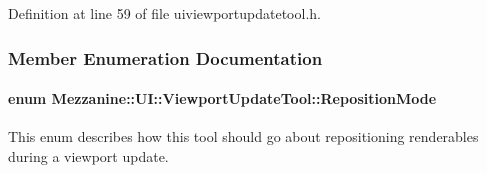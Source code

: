 Definition at line 59 of file uiviewportupdatetool.h.



\subsubsection{Member Enumeration Documentation}
\hypertarget{classMezzanine_1_1UI_1_1ViewportUpdateTool_ad2de82a6fc57859d914845ce676ff67e}{
\paragraph[{RepositionMode}]{\setlength{\rightskip}{0pt plus 5cm}enum {\bf Mezzanine::UI::ViewportUpdateTool::RepositionMode}}\hfill}
\label{classMezzanine_1_1UI_1_1ViewportUpdateTool_ad2de82a6fc57859d914845ce676ff67e}


This enum describes how this tool should go about repositioning renderables during a viewport update. 

